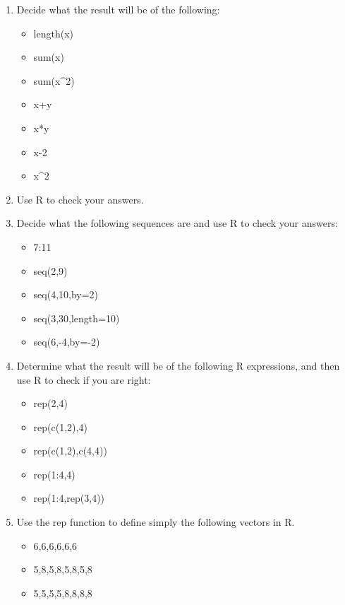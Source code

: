 \documentclass[
]{book}
\providecommand{\tightlist}{%
  \setlength{\itemsep}{0pt}\setlength{\parskip}{0pt}}
\begin{document}
\begin{enumerate}
\def\labelenumi{\arabic{enumi}.}
\setcounter{enumi}{1}
\tightlist
\item
  Decide what the result will be of the following:

  \begin{itemize}
  \tightlist
  \item
    length(x)
  \item
    sum(x)
  \item
    sum(x\^{}2)
  \item
    x+y
  \item
    x*y
  \item
    x-2
  \item
    x\^{}2
  \end{itemize}
\item
  Use R to check your answers.
\item
  Decide what the following sequences are and use R to check your answers:

  \begin{itemize}
  \tightlist
  \item
    7:11
  \item
    seq(2,9)
  \item
    seq(4,10,by=2)
  \item
    seq(3,30,length=10)
  \item
    seq(6,-4,by=-2)
  \end{itemize}
\item
  Determine what the result will be of the following R expressions, and then use R to check if you are right:

  \begin{itemize}
  \tightlist
  \item
    rep(2,4)
  \item
    rep(c(1,2),4)
  \item
    rep(c(1,2),c(4,4))
  \item
    rep(1:4,4)
  \item
    rep(1:4,rep(3,4))
  \end{itemize}
\item
  Use the rep function to define simply the following vectors in R.

  \begin{itemize}
  \tightlist
  \item
    6,6,6,6,6,6
  \item
    5,8,5,8,5,8,5,8
  \item
    5,5,5,5,8,8,8,8
  \end{itemize}
\end{enumerate}
\end{document}
